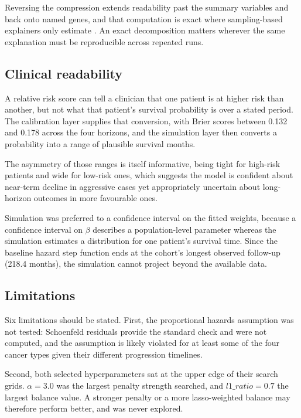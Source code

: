 \documentclass[10pt,a4paper]{article}
\begin{document}
Reversing the compression extends readability past the summary variables and back
onto named genes, and that computation is exact where sampling-based explainers only
estimate \citep{lundberg2017unified, ribeiro2016why}. An exact decomposition
matters wherever the same explanation must be reproducible across repeated runs.

\subsection{Clinical readability}

A relative risk score can tell a clinician that one patient is at higher risk than
another, but not what that patient's survival probability is over a stated period.
The calibration layer supplies that conversion, with Brier scores between 0.132 and
0.178 across the four horizons, and the simulation layer then converts a probability
into a range of plausible survival months.

The asymmetry of those ranges is itself informative, being tight for high-risk
patients and wide for low-risk ones, which suggests the model is confident about
near-term decline in aggressive cases yet appropriately uncertain about long-horizon
outcomes in more favourable ones.

Simulation was preferred to a confidence interval on the fitted weights, because a
confidence interval on $\beta$ describes a population-level parameter whereas the
simulation estimates a distribution for one patient's survival time. Since the
baseline hazard step function ends at the cohort's longest observed follow-up
(218.4 months), the simulation cannot project beyond the available data.

\subsection{Limitations}

Six limitations should be stated. First, the proportional hazards assumption was
not tested: Schoenfeld residuals provide the standard check
\citep{schoenfeld1982partial} and were not computed, and the assumption is likely
violated for at least some of the four cancer types given their different
progression timelines.

Second, both selected hyperparameters sat at the upper edge of their search grids.
$\alpha = 3.0$ was the largest penalty strength searched, and $l1\_ratio = 0.7$ the
largest balance value. A stronger penalty or a more lasso-weighted balance may
therefore perform better, and was never explored.
\end{document}
